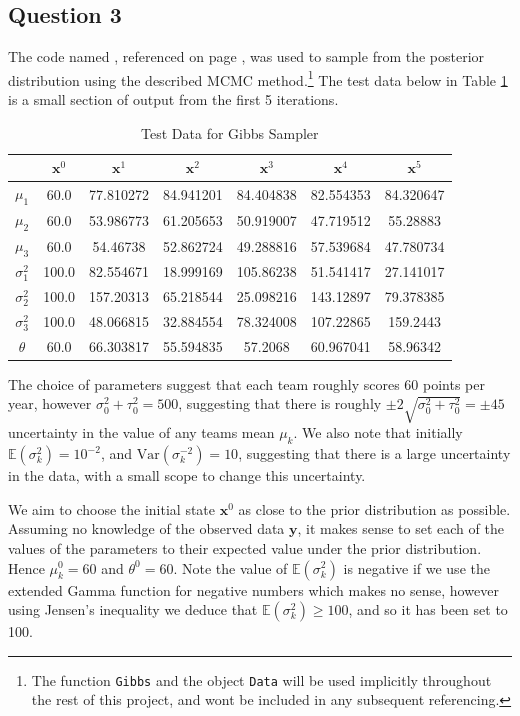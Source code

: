 \documentclass[10pt,a4paper,notitlepage]{article}
\newcommand{\E}{\mathbb{E}}
\newcommand{\Var}{\text{Var}}
\newcommand{\x}{\mathbf{x}}
\newcommand{\y}{\mathbf{y}}
\begin{document}
\subsection*{\centering Question 3}
The code named , referenced on page \pageref{cd:Gibbs}, was used to sample from the posterior distribution using the described MCMC method.\footnote{The function \texttt{Gibbs} and the object \texttt{Data} will be used implicitly throughout the rest of this project, and wont be included in any subsequent referencing.} The test data below in Table \ref{tb:6} is a small section of output from the first 5 iterations.
\begin{table}[H]
\centering
\begin{tabular}{c|cccccc}
& $\x^{0}$ & $\x^{1}$ & $\x^{2}$ & $\x^{3}$ & $\x^{4}$ & $\x^{5}$\\ \hline
$\mu_{1}$ & 60.0 & 77.810272 & 84.941201 & 84.404838 & 82.554353 & 84.320647\\ 
$\mu_{2}$ & 60.0 & 53.986773 & 61.205653 & 50.919007 & 47.719512 & 55.28883\\ 
$\mu_{3}$ & 60.0 & 54.46738 & 52.862724 & 49.288816 & 57.539684 & 47.780734\\ 
$\sigma_{1}^{2}$ & 100.0 & 82.554671 & 18.999169 & 105.86238 & 51.541417 & 27.141017\\ 
$\sigma_{2}^{2}$ & 100.0 & 157.20313 & 65.218544 & 25.098216 & 143.12897 & 79.378385\\ 
$\sigma_{3}^{2}$ & 100.0 & 48.066815 & 32.884554 & 78.324008 & 107.22865 & 159.2443\\ 
$\theta$ & 60.0 & 66.303817 & 55.594835 & 57.2068 & 60.967041 & 58.96342
\end{tabular}
\caption{Test Data for Gibbs Sampler}\label{tb:6}
\end{table}

The choice of parameters suggest that each team roughly scores 60 points per year, however $\sigma_{0}^{2}+\tau_{0}^{2}=500$, suggesting that there is roughly $\pm 2\sqrt{\sigma_{0}^{2}+\tau_{0}^{2}}=\pm 45$ uncertainty in the value of any teams mean $\mu_{k}$. We also note that initially $\E(\sigma_{k}^{2})=10^{-2}$, and $\Var(\sigma_{k}^{-2})=10$, suggesting that there is a large uncertainty in the data, with a small scope to change this uncertainty.

We aim to choose the initial state $\x^{0}$ as close to the prior distribution as possible. Assuming no knowledge of the observed data $\y$, it makes sense to set each of the values of the parameters to their expected value under the prior distribution. Hence $\mu_{k}^{0}=60$ and $\theta^{0}=60$. Note the value of $\E(\sigma_{k}^{2})$ is negative if we use the extended Gamma function for negative numbers which makes no sense, however using Jensen's inequality we deduce that $\E(\sigma_{k}^{2})\geq 100$, and so it has been set to 100.
\end{document}
